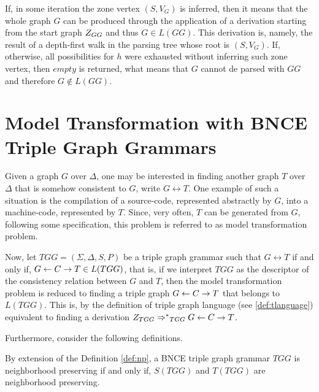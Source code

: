 \documentclass[]{report}
\begin{document}
If, in some iteration the zone vertex $(S, V_G)$ is inferred, then it means that the whole graph $G$ can be produced through the application of a derivation starting from the start graph $Z_{GG}$ and thus $G \in L(GG)$. This derivation is, namely, the result of a depth-first walk in the parsing tree whose root is $(S, V_G)$. If, otherwise, all possibilities for $h$ were exhausted without inferring such zone vertex, then $empty$ is returned, what means that $G$ cannot de parsed with $GG$ and therefore $G \notin L(GG)$.




\section{Model Transformation with BNCE Triple Graph Grammars}
Given a graph $G$ over $\Delta$, one may be interested in finding another graph $T$ over $\Delta$ that is somehow consistent to $G$, write $G \rel T$. One example of such a situation is the compilation of a source-code, represented abstractly by $G$, into a machine-code, represented by $T$. Since, very often, $T$ can be generated from $G$, following some specification, this problem is referred to as model transformation problem.

Now, let $TGG = (\Sigma, \Delta, S, P)$ be a triple graph grammar such that $G \rel T$ if and only if, $G \overset{}{\leftarrow} C \overset{}{\rightarrow} T \in L(TGG)$, that is, if we interpret $TGG$ as the descriptor of the consistency relation between $G$ and $T$, then the model transformation problem is reduced to finding a triple graph $G \overset{}{\leftarrow} C \overset{}{\rightarrow} T$ that belongs to $L(TGG)$. This is, by the definition of triple graph language (see \ref{def:tlanguage}) equivalent to finding a derivation $\startTG{TGG} \tderivtr{}{}{TGG} G \ms{} C \mt{} T$.

Furthermore, consider the following definitions.

\begin{definition}
	By extension of the Definition \ref{def:np}, a BNCE triple graph grammar $TGG$ is neighborhood preserving if and only if, $S(TGG)$ and $T(TGG)$ are neighborhood preserving.
\end{definition}
\end{document}
